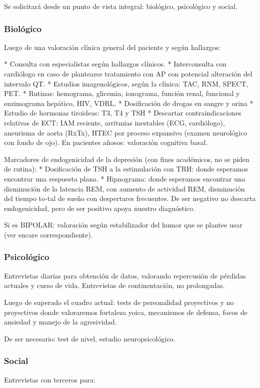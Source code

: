 \documentclass{scrbook}
\begin{document}
Se solicitará desde un punto de vista integral: biológico, psicológico y social.
\subsubsection*{Biológico}
Luego de una valoración clínica general del paciente y según hallazgos:

* Consulta con especialistas según hallazgos clínicos.
* Interconsulta con cardiólogo en caso de plantearse tratamiento con AP con potencial alteración del intervalo QT.
* Estudios imagenológicos, según la clínica: TAC, RNM, SPECT, PET.
* Rutinas: hemograma, glicemia, ionograma, función renal, funcional y enzimograma hepático, HIV, VDRL.
* Dosificación de drogas en sangre y orina
* Estudio de hormonas tiroideas: T3, T4 y TSH
* Descartar contraindicaciones relativas de ECT: IAM reciente, arritmias inestables (ECG, cardiólogo), aneurisma de aorta (RxTx), HTEC por proceso expansivo (examen neurológico con fondo de ojo). En pacientes añosos: valoración cognitiva basal.

Marcadores de endogenicidad de la depresión (con fines académicos, no se piden de rutina):
* Dosificación de TSH a la estimulación con TRH: donde esperamos encontrar una respuesta plana.
* Hipnograma: donde esperamos encontrar una disminución de la latencia REM, con aumento de actividad REM, disminución del tiempo to-tal de sueño con despertares frecuentes. De ser negativo no descarta endogenicidad, pero de ser positivo apoya nuestro diagnóstico.

Si es BIPOLAR: valoración según estabilizador del humor que se plantee usar (ver encare correspondiente).
\subsubsection*{Psicológico}
Entrevistas diarias para obtención de datos, valorando repercusión de pérdidas actuales y curso de vida. Entrevistas de continentación, no prolongadas.

Luego de superado el cuadro actual: tests de personalidad proyectivos y no proyectivos donde valoraremos fortaleza yoica, mecanismos de defensa, focos de ansiedad y manejo de la agresividad.

De ser necesario: test de nivel, estudio neuropsicológico.
\subsubsection*{Social}
Entrevistas con terceros para:
\end{document}
